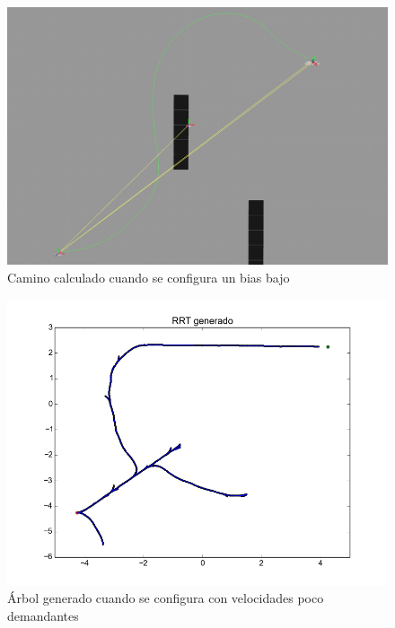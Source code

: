 \documentclass[a4paper]{article}
\theoremstyle{plain}
\theoremstyle{remark}
\theoremstyle{definition}
\begin{document}
\begin{figure}[ht]
    \begin{center}
        \includegraphics[scale=0.35]{imagenes/rviz_bias_bajo.png}
        \caption{Camino calculado cuando se configura un bias bajo}
    \end{center}
\end{figure}

\begin{figure}[ht]
    \begin{center}
        \includegraphics[scale=0.8]{imagenes/arbol_poco_demandante.png}
        \caption{Árbol generado cuando se configura con velocidades poco demandantes}
    \end{center}
\end{figure}
\end{document}
